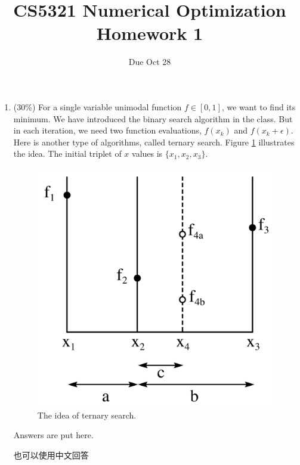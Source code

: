 \documentclass[a4paper,10pt]{article}
\title{CS5321 Numerical Optimization Homework 1}
\author{Due Oct 28}
\date{}
\begin{document}
\maketitle
\begin{enumerate}
 \item (30\%) For a single variable unimodal function $f \in [0, 1]$, we want to find its minimum.  We have introduced the binary search algorithm in the class.  But in each iteration, we need two function evaluations, $f(x_k)$ and $f(x_k+\epsilon)$.  Here is another type of algorithms, called ternary search. Figure \ref{fig1} illustrates the idea.  The initial triplet of $x$ values is $\{x_1, x_2, x_3\}$.   
\begin{figure}[h]
\centering
\includegraphics[scale=0.1]{GoldenSectionSearch.png}
\caption{The idea of ternary search.}
\label{fig1}
\end{figure}

{\color{blue} Answers are put here. 

    \begin{CJK*}{UTF8}{bsmi}
也可以使用中文回答
\end{CJK*}

}



\end{enumerate}
\end{document}
